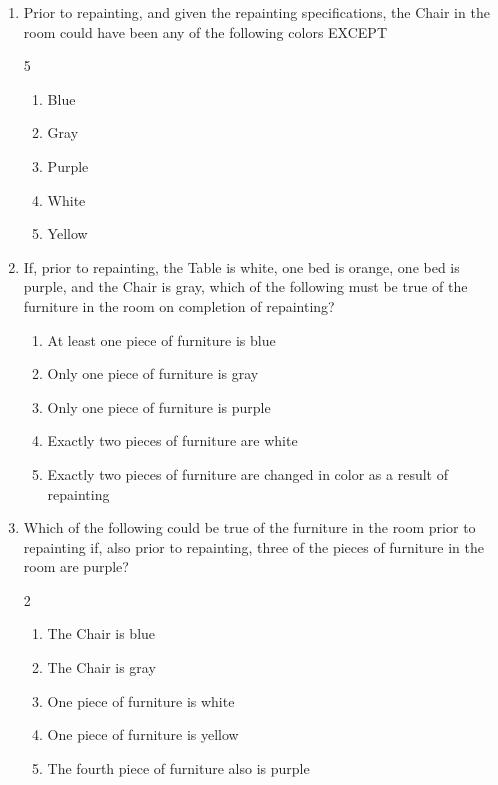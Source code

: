 \documentclass[12pt]{article}
\begin{document}
\begin{enumerate}[label=\textbf{\arabic*.}, start=1]
    \item Prior to repainting, and given the repainting specifications, the Chair in the room could have been any of the following colors EXCEPT
   \begin{multicols}{5}
    \begin{enumerate}[label=(\Alph*)]
        \item Blue
        \item Gray
        \item Purple
        \item White
        \item Yellow
    \end{enumerate}
    \end{multicols}

    \item If, prior to repainting, the Table is white, one bed is orange, one bed is purple, and the Chair is gray, which of the following must be true of the furniture in the room on completion of repainting?

    \begin{enumerate}[label=(\Alph*)]
        \item At least one piece of furniture is blue
        \item Only one piece of furniture is gray
        \item Only one piece of furniture is purple
        \item Exactly two pieces of furniture are white
        \item Exactly two pieces of furniture are changed in color as a result of repainting
    \end{enumerate}
 

    \item Which of the following could be true of the furniture in the room prior to repainting if, also prior to repainting, three of the pieces of furniture in the room are purple?
   \begin{multicols}{2}
    \begin{enumerate}[label=(\Alph*)]
        \item The Chair is blue
        \item The Chair is gray
        \item One piece of furniture is white
        \item One piece of furniture is yellow
        \item The fourth piece of furniture also is purple
    \end{enumerate}
    \end{multicols}



\end{enumerate}
\end{document}
